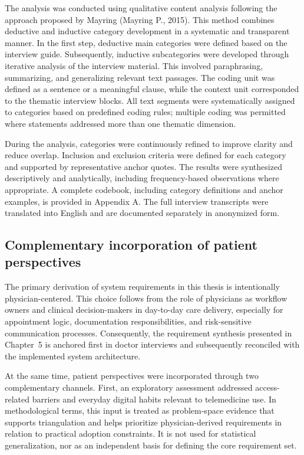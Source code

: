 The analysis was conducted using qualitative content analysis following the approach proposed by Mayring (Mayring P., 2015). This method combines deductive and inductive category development in a systematic and transparent manner. In the first step, deductive main categories were defined based on the interview guide. Subsequently, inductive subcategories were developed through iterative analysis of the interview material. This involved paraphrasing, summarizing, and generalizing relevant text passages. The coding unit was defined as a sentence or a meaningful clause, while the context unit corresponded to the thematic interview blocks. All text segments were systematically assigned to categories based on predefined coding rules; multiple coding was permitted where statements addressed more than one thematic dimension.

During the analysis, categories were continuously refined to improve clarity and reduce overlap. Inclusion and exclusion criteria were defined for each category and supported by representative anchor quotes. The results were synthesized descriptively and analytically, including frequency-based observations where appropriate. A complete codebook, including category definitions and anchor examples, is provided in Appendix A. The full interview transcripts were translated into English and are documented separately in anonymized form.

\subsection{Complementary incorporation of patient perspectives}

The primary derivation of system requirements in this thesis is intentionally physician-centered. This choice follows from the role of physicians as workflow owners and clinical decision-makers in day-to-day care delivery, especially for appointment logic, documentation responsibilities, and risk-sensitive communication processes. Consequently, the requirement synthesis presented in Chapter~5 is anchored first in doctor interviews and subsequently reconciled with the implemented system architecture.

At the same time, patient perspectives were incorporated through two complementary channels. First, an exploratory assessment addressed access-related barriers and everyday digital habits relevant to telemedicine use. In methodological terms, this input is treated as problem-space evidence that supports triangulation and helps prioritize physician-derived requirements in relation to practical adoption constraints. It is not used for statistical generalization, nor as an independent basis for defining the core requirement set.

